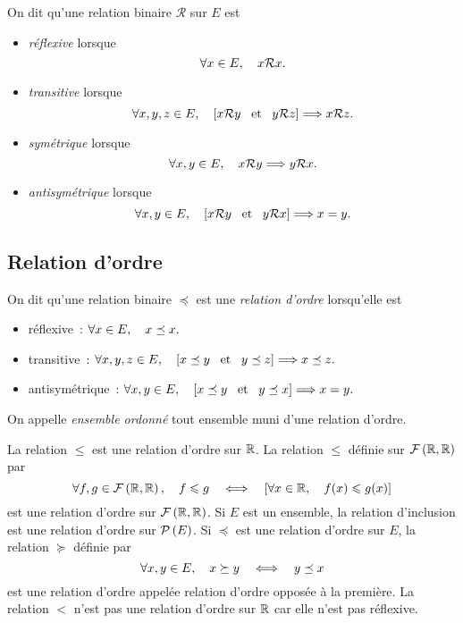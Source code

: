 \documentclass{magnolia}
\begin{document}
\begin{definition}[utile=-3]
On dit qu'une relation binaire $\mathcal{R}$ sur $E$ est
\begin{itemize}
\item \emph{réflexive} lorsque
  \[\forall x\in E ,\quad x\mathcal{R} x.\]
\item \emph{transitive} lorsque
  \[\forall x,y,z\in E ,\quad \left[x\mathcal{R} y \quad\!\text{et}\quad\! y\mathcal{R} z\right] \Longrightarrow
    x\mathcal{R} z.\]
\item \emph{symétrique} lorsque
  \[\forall x,y\in E ,\quad x\mathcal{R} y \Longrightarrow y\mathcal{R} x.\]
\item \emph{antisymétrique} lorsque
  \[\forall x,y\in E ,\quad \left[x \mathcal{R}y \quad\!\text{et}\quad\! y\mathcal{R} x\right] \Longrightarrow
    x=y.\]
\end{itemize}
\end{definition}

\subsection{Relation d'ordre}

\begin{definition}[utile=-3]
On dit qu'une relation binaire $\preceq$ est une
\emph{relation d'ordre} lorsqu'elle est
\begin{itemize}
\item réflexive~: $\forall x\in E ,\quad x\preceq x.$
\item transitive~: $\forall x,y,z\in E ,\quad \left[x\preceq y \quad\!\text{et}\quad\! y\preceq z\right]
  \Longrightarrow x\preceq z.$
\item antisymétrique~: $\forall x,y\in E ,\quad \left[x\preceq y \quad\!\text{et}\quad\! y\preceq x\right]
  \Longrightarrow x=y.$
\end{itemize}
On appelle \emph{ensemble ordonné} tout ensemble muni d'une relation d'ordre.
\end{definition}

\begin{remarques}
\remarque La relation $\leq$ est une relation d'ordre sur $\mathbb{R}$.  La relation
  $\leq$ définie sur $\mathcal{F}\left(\mathbb{R},\mathbb{R}\right)$ par
  \[\forall f,g\in\mathcal{F}\left(\mathbb{R},\mathbb{R}\right) ,\quad f\leqslant g \quad\Longleftrightarrow\quad
    \left[\forall x\in\mathbb{R} ,\quad f(x)\leqslant g(x)\right]\]
  est une relation d'ordre sur $\mathcal{F}\left(\mathbb{R},\mathbb{R}\right)$.
 \remarque Si $E$ est un ensemble,
  la relation d'inclusion est une relation d'ordre sur $\mathcal{P}\left(E\right)$. 
\remarque Si $\preceq$ est une relation d'ordre sur $E$, la relation
  $\succeq$ définie par
  \[\forall x,y\in E ,\quad x\succeq y \quad\Longleftrightarrow\quad y\preceq x\]
  est une relation d'ordre appelée relation d'ordre opposée à la première.
\remarque La relation $<$ n'est pas une relation d'ordre sur $\mathbb{R}$ car elle
  n'est pas réflexive.
\end{remarques}
\end{document}
